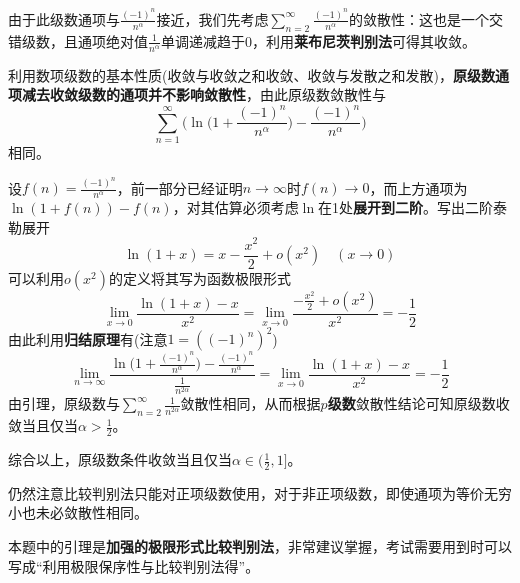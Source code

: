 \documentclass[a4paper,UTF8,fontset=windows,AutoFakeBold]{ctexart}
\newcommand*{\suminf}[1][n=1]{\sum_{#1}^\infty}
\newcommand*{\note}{\noindent *}
\theoremstyle{ex}
\begin{document}
\begin{framed}
{\begin{itemize}
        由于此级数通项与$\frac{(-1)^n}{n^\alpha}$接近，我们先考虑$\suminf[n=2]\frac{(-1)^n}{n^\alpha}$的敛散性：这也是一个交错级数，且通项绝对值$\frac{1}{n^\alpha}$单调递减趋于0，利用\textbf{莱布尼茨判别法}可得其收敛。

        利用数项级数的基本性质(收敛与收敛之和收敛、收敛与发散之和发散)，\textbf{原级数通项减去收敛级数的通项并不影响敛散性}，由此原级数敛散性与
        $$\suminf\bigg(\ln\bigg(1+\frac{(-1)^n}{n^\alpha}\bigg)-\frac{(-1)^n}{n^\alpha}\bigg)$$
        相同。
    
        设$f(n)=\frac{(-1)^n}{n^\alpha}$，前一部分已经证明$n\to\infty$时$f(n)\to0$，而上方通项为$\ln(1+f(n))-f(n)$，对其估算必须考虑$\ln$在1处\textbf{展开到二阶}。写出二阶泰勒展开
        $$\ln(1+x)=x-\frac{x^2}{2}+o(x^2)\quad(x\to0)$$
        可以利用$o(x^2)$的定义将其写为函数极限形式
        $$\lim_{x\to0}\frac{\ln(1+x)-x}{x^2}=\lim_{x\to0}\frac{-\frac{x^2}{2}+o(x^2)}{x^2}=-\frac{1}{2}$$
        由此利用\textbf{归结原理}有(注意$1=((-1)^n)^2$)
        $$\lim_{n\to\infty}\frac{\ln\big(1+\frac{(-1)^n}{n^\alpha}\big)-\frac{(-1)^n}{n^\alpha}}{\frac{1}{n^{2\alpha}}}=\lim_{x\to0}\frac{\ln(1+x)-x}{x^2}=-\frac{1}{2}$$
        由引理，原级数与$\suminf[n=2]\frac{1}{n^{2\alpha}}$敛散性相同，从而根据\textbf{$p$级数}敛散性结论可知原级数收敛当且仅当$\alpha>\frac{1}{2}$。

        综合以上，原级数条件收敛当且仅当$\alpha\in(\frac{1}{2},1]$。
    \end{itemize}
}
\end{framed}

\note 仍然注意比较判别法只能对正项级数使用，对于非正项级数，即使通项为等价无穷小也未必敛散性相同。

\note 本题中的引理是\textbf{加强的极限形式比较判别法}，非常建议掌握，考试需要用到时可以写成``利用极限保序性与比较判别法得''。
\end{document}
